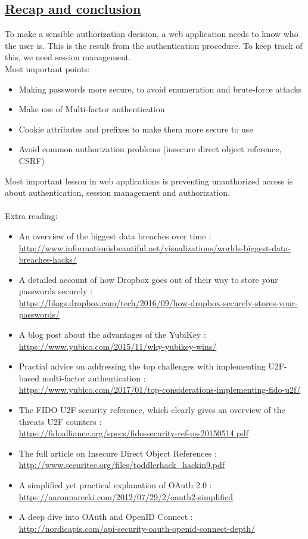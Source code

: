 \documentclass[titlepage]{article}
\begin{document}
    \subsection{\href{https://youtu.be/KcAG_o1NxyY}{Recap and conclusion}}
    To make a sensible authorization decision, a web application needs to know who the user is. This is the result from the authentication procedure. To keep track of this, we need session management.\\
    Most important points:
    \begin{itemize}
        \item Making passwords more secure, to avoid enumeration and brute-force attacks
        \item Make use of Multi-factor authentication
        \item Cookie attributes and prefixes to make them more secure to use
        \item Avoid common authorization problems (insecure direct object reference, CSRF)
    \end{itemize}
    Most important lesson in web applications is preventing unauthorized access is about authentication, session management and authorization.\\\\
    Extra reading:
    \begin{itemize}
        \item An overview of the biggest data breaches over time : \\\url{http://www.informationisbeautiful.net/visualizations/worlds-biggest-data-breaches-hacks/}
        \item A detailed account of how Dropbox goes out of their way to store your passwords securely : \\\url{https://blogs.dropbox.com/tech/2016/09/how-dropbox-securely-stores-your-passwords/}
        \item A blog post about the advantages of the YubiKey : \\\url{https://www.yubico.com/2015/11/why-yubikey-wins/}
        \item Practial advice on addressing the top challenges with implementing U2F-based multi-factor authentication : \\\url{https://www.yubico.com/2017/01/top-considerations-implementing-fido-u2f/}
        \item The FIDO U2F security reference, which clearly gives an overview of the threats U2F counters : \\\url{https://fidoalliance.org/specs/fido-security-ref-ps-20150514.pdf}
        \item The full article on Insecure Direct Object References : \\\url{http://www.securitee.org/files/toddlerhack_hackin9.pdf}
        \item A simplified yet practical explanation of OAuth 2.0 : \\\url{https://aaronparecki.com/2012/07/29/2/oauth2-simplified}
        \item A deep dive into OAuth and OpenID Connect : \\\url{http://nordicapis.com/api-security-oauth-openid-connect-depth/}
    \end{itemize}
    \newpage
\end{document}
